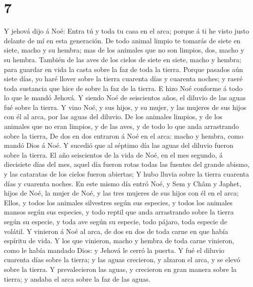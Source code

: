 \hypertarget{section-6}{%
\section{7}\label{section-6}}

 Y jehová dijo á Noé: Entra tú y toda tu casa en el arca;
porque á ti he visto justo delante de mí en esta generación.
 De todo animal limpio te tomarás de siete en siete, macho y
su hembra; mas de los animales que no son limpios, dos, macho y su
hembra.  También de las aves de los cielos de siete en
siete, macho y hembra; para guardar en vida la casta sobre la faz de
toda la tierra.  Porque pasados aún siete días, yo haré
llover sobre la tierra cuarenta días y cuarenta noches; y raeré toda
sustancia que hice de sobre la faz de la tierra.  E hizo Noé
conforme á todo lo que le mandó Jehová.  Y siendo Noé de
seiscientos años, el diluvio de las aguas fué sobre la tierra.
 Y vino Noé, y sus hijos, y su mujer, y las mujeres de sus
hijos con él al arca, por las aguas del diluvio.  De los
animales limpios, y de los animales que no eran limpios, y de las aves,
y de todo lo que anda arrastrando sobre la tierra,  De dos
en dos entraron á Noé en el arca: macho y hembra, como mandó Dios á Noé.
 Y sucedió que al séptimo día las aguas del diluvio fueron
sobre la tierra.  El año seiscientos de la vida de Noé, en
el mes segundo, á diecisiete días del mes, aquel día fueron rotas todas
las fuentes del grande abismo, y las cataratas de los cielos fueron
abiertas;  Y hubo lluvia sobre la tierra cuarenta días y
cuarenta noches.  En este mismo día entró Noé, y Sem y Châm
y Japhet, hijos de Noé, la mujer de Noé, y las tres mujeres de sus hijos
con él en el arca;  Ellos, y todos los animales silvestres
según sus especies, y todos los animales mansos según sus especies, y
todo reptil que anda arrastrando sobre la tierra según su especie, y
toda ave según su especie, todo pájaro, toda especie de volátil.
 Y vinieron á Noé al arca, de dos en dos de toda carne en
que había espíritu de vida.  Y los que vinieron, macho y
hembra de toda carne vinieron, como le había mandado Dios: y Jehová le
cerró la puerta.  Y fué el diluvio cuarenta días sobre la
tierra; y las aguas crecieron, y alzaron el arca, y se elevó sobre la
tierra.  Y prevalecieron las aguas, y crecieron en gran
manera sobre la tierra; y andaba el arca sobre la faz de las aguas.
